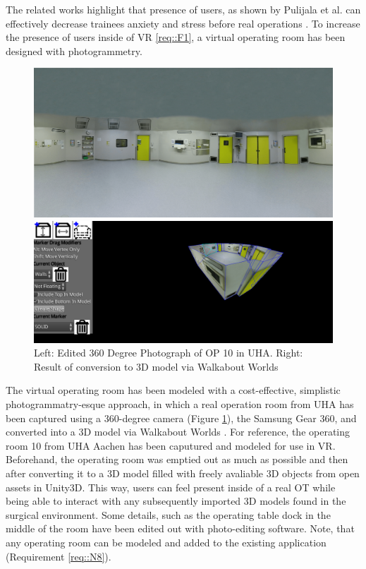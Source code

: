 The related works highlight that presence of users, as shown by Pulijala et al. can effectively decrease trainees anxiety and stress before real operations \cite{Pulijala.2017}.
To increase the presence of users inside of VR \ref{req::F1}, a virtual operating room has been designed with photogrammetry.

\begin{figure}[ht]
    \centering
    \begin{minipage}{.5\textwidth}
      \centering
      \includegraphics[width=0.95\linewidth]{images/implementation/operating_room_360.png}
    \end{minipage}%
    \begin{minipage}{.5\textwidth}
      \centering
      \includegraphics[width=0.95\linewidth]{images/implementation/walkabout_worlds.png}
    \end{minipage}
    \caption{\label{fig::360OperatingRoom}Left: Edited 360 Degree Photograph of OP 10 in UHA. Right: Result of conversion to 3D model via Walkabout Worlds}
\end{figure}

The virtual operating room has been modeled with a cost-effective, simplistic photogrammatry-esque approach, in which a real operation room from UHA has been captured using a 
360-degree camera (Figure \ref{fig::360OperatingRoom}), the Samsung Gear 360, and converted into a 3D model via Walkabout Worlds \cite{WalkaboutWorlds}.
For reference, the operating room 10 from UHA Aachen has been caputured and modeled for use in VR.
Beforehand, the operating room was emptied out as much as possible and then after converting it to a 3D model filled with freely avaliable 3D objects from open assets in Unity3D.
This way, users can feel present inside of a real OT while being able to interact with any subsequently imported 3D models found in the surgical environment.
Some details, such as the operating table dock in the middle of the room have been edited out with photo-editing software.
Note, that any operating room can be modeled and added to the existing application (Requirement \ref{req::N8}).


